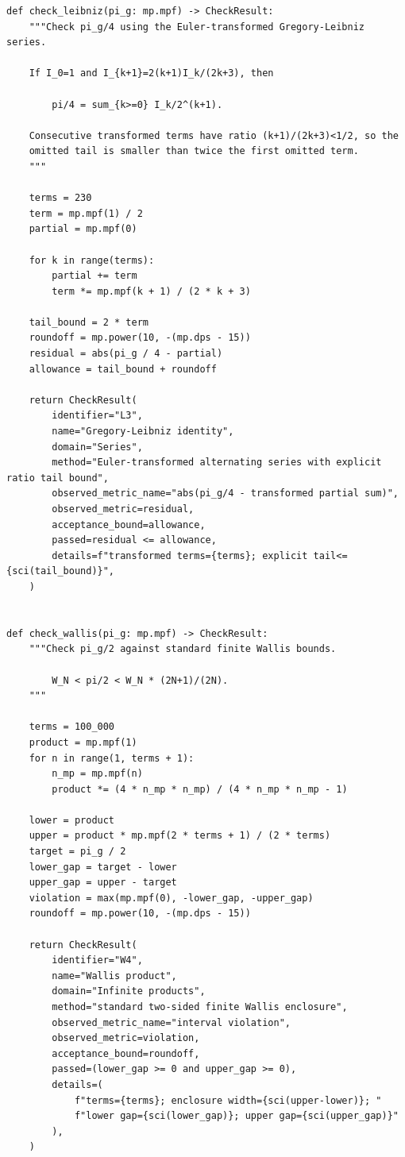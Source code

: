 \documentclass[11pt]{article}
\begin{document}
\begin{lstlisting}[style=pythonstyle,caption={\texttt{verify\_pi\_g\_identities.py}}]
def check_leibniz(pi_g: mp.mpf) -> CheckResult:
    """Check pi_g/4 using the Euler-transformed Gregory-Leibniz series.

    If I_0=1 and I_{k+1}=2(k+1)I_k/(2k+3), then

        pi/4 = sum_{k>=0} I_k/2^(k+1).

    Consecutive transformed terms have ratio (k+1)/(2k+3)<1/2, so the
    omitted tail is smaller than twice the first omitted term.
    """

    terms = 230
    term = mp.mpf(1) / 2
    partial = mp.mpf(0)

    for k in range(terms):
        partial += term
        term *= mp.mpf(k + 1) / (2 * k + 3)

    tail_bound = 2 * term
    roundoff = mp.power(10, -(mp.dps - 15))
    residual = abs(pi_g / 4 - partial)
    allowance = tail_bound + roundoff

    return CheckResult(
        identifier="L3",
        name="Gregory-Leibniz identity",
        domain="Series",
        method="Euler-transformed alternating series with explicit ratio tail bound",
        observed_metric_name="abs(pi_g/4 - transformed partial sum)",
        observed_metric=residual,
        acceptance_bound=allowance,
        passed=residual <= allowance,
        details=f"transformed terms={terms}; explicit tail<={sci(tail_bound)}",
    )


def check_wallis(pi_g: mp.mpf) -> CheckResult:
    """Check pi_g/2 against standard finite Wallis bounds.

        W_N < pi/2 < W_N * (2N+1)/(2N).
    """

    terms = 100_000
    product = mp.mpf(1)
    for n in range(1, terms + 1):
        n_mp = mp.mpf(n)
        product *= (4 * n_mp * n_mp) / (4 * n_mp * n_mp - 1)

    lower = product
    upper = product * mp.mpf(2 * terms + 1) / (2 * terms)
    target = pi_g / 2
    lower_gap = target - lower
    upper_gap = upper - target
    violation = max(mp.mpf(0), -lower_gap, -upper_gap)
    roundoff = mp.power(10, -(mp.dps - 15))

    return CheckResult(
        identifier="W4",
        name="Wallis product",
        domain="Infinite products",
        method="standard two-sided finite Wallis enclosure",
        observed_metric_name="interval violation",
        observed_metric=violation,
        acceptance_bound=roundoff,
        passed=(lower_gap >= 0 and upper_gap >= 0),
        details=(
            f"terms={terms}; enclosure width={sci(upper-lower)}; "
            f"lower gap={sci(lower_gap)}; upper gap={sci(upper_gap)}"
        ),
    )



\end{lstlisting}
\end{document}

